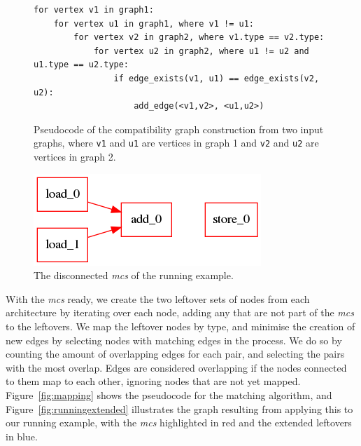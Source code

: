 \begin{figure}[!htb]
\begin{lstlisting}[title={Compatibility graph construction}, keywords={for, in, where, if, and}]
for vertex v1 in graph1:
    for vertex u1 in graph1, where v1 != u1:
        for vertex v2 in graph2, where v1.type == v2.type:
            for vertex u2 in graph2, where u1 != u2 and u1.type == u2.type:
                if edge_exists(v1, u1) == edge_exists(v2, u2):
                    add_edge(<v1,v2>, <u1,u2>)
\end{lstlisting}
    \caption{Pseudocode of the compatibility graph construction from two input graphs, where \texttt{v1} and \texttt{u1} are vertices in graph 1 and \texttt{v2} and \texttt{u2} are vertices in graph 2.}
    \label{fig:cgconstruction}
\end{figure}

\begin{figure}[!htb]
    \centering
    \includegraphics[scale=0.5]{graphs/running_example1+running_example2_mcs.png}
    \caption{The disconnected \textit{mcs} of the running example.}
    \label{fig:runningmcs}
\end{figure}

With the \textit{mcs} ready, we create the two leftover sets of nodes from each architecture by iterating over each node, adding any that are not part of the \textit{mcs} to the leftovers. We map the leftover nodes by type, and minimise the creation of new edges by selecting nodes with matching edges in the process. We do so by counting the amount of overlapping edges for each pair, and selecting the pairs with the most overlap. Edges are considered overlapping if the nodes connected to them map to each other, ignoring nodes that are not yet mapped. Figure~\ref{fig:mapping} shows the pseudocode for the matching algorithm, and Figure~\ref{fig:runningextended} illustrates the graph resulting from applying this to our running example, with the \textit{mcs} highlighted in red and the extended leftovers in blue.

